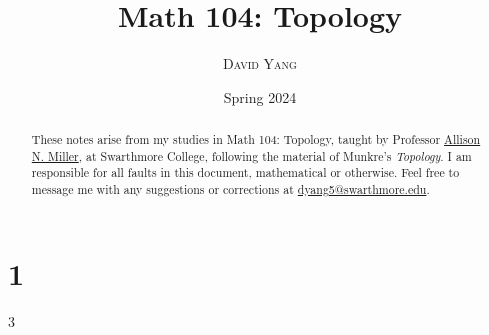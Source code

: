 \documentclass[11pt]{article}
\begin{document}
\title{\LARGE \textbf{Math 104: Topology}}
\date{Spring 2024}
\author{\textsc{David Yang}}

\maketitle

\begin{abstract}
These notes arise from my studies in Math 104: Topology, taught by 
Professor \href{https://sites.google.com/view/anmiller/}{Allison N. Miller}, at Swarthmore College, following the material of Munkre's \textit{Topology}.
I am responsible for all faults in this document, mathematical or otherwise.
Feel free to message me with any suggestions or corrections at \href{mailto:dyang5@swarthmore.edu}{dyang5@swarthmore.edu}.
\end{abstract}

\tableofcontents

\chapter{1}{3}
\end{document}
